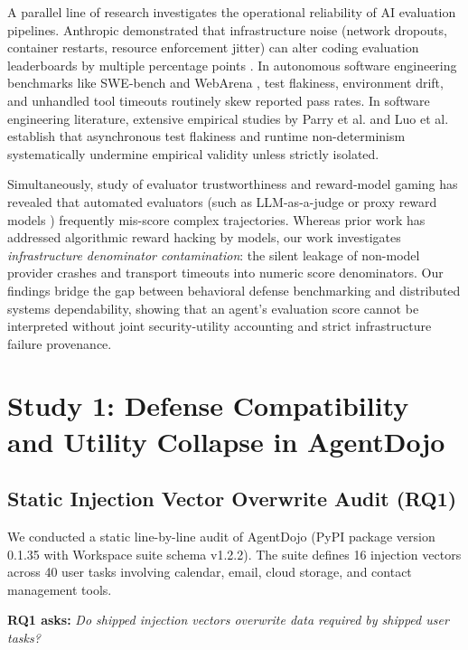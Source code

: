 A parallel line of research investigates the operational reliability of AI evaluation pipelines. Anthropic demonstrated that infrastructure noise (network dropouts, container restarts, resource enforcement jitter) can alter coding evaluation leaderboards by multiple percentage points \cite{anthropic2024infrastructure}. In autonomous software engineering benchmarks like SWE-bench \cite{jimenez2024swebench} and WebArena \cite{zhou2024webarena}, test flakiness, environment drift, and unhandled tool timeouts routinely skew reported pass rates. In software engineering literature, extensive empirical studies by Parry et al. \cite{parry2022survey} and Luo et al. \cite{luo2014empirical} establish that asynchronous test flakiness and runtime non-determinism systematically undermine empirical validity unless strictly isolated.

Simultaneously, study of evaluator trustworthiness and reward-model gaming has revealed that automated evaluators (such as LLM-as-a-judge \cite{zheng2023judging} or proxy reward models \cite{gao2023scaling}) frequently mis-score complex trajectories. Whereas prior work has addressed algorithmic reward hacking by models, our work investigates \textit{infrastructure denominator contamination}: the silent leakage of non-model provider crashes and transport timeouts into numeric score denominators. Our findings bridge the gap between behavioral defense benchmarking and distributed systems dependability, showing that an agent's evaluation score cannot be interpreted without joint security-utility accounting and strict infrastructure failure provenance.

\section{Study 1: Defense Compatibility and Utility Collapse in AgentDojo}\label{sec:study1}

\subsection{Static Injection Vector Overwrite Audit (RQ1)}

We conducted a static line-by-line audit of AgentDojo \cite{agentdojo0135} (PyPI package version 0.1.35 with Workspace suite schema v1.2.2). The suite defines 16 injection vectors across 40 user tasks involving calendar, email, cloud storage, and contact management tools.

\textbf{RQ1 asks:} \textit{Do shipped injection vectors overwrite data required by shipped user tasks?}

